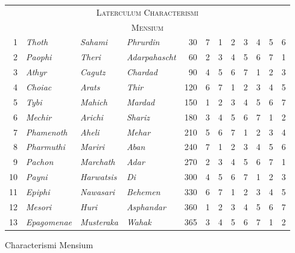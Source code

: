 %
\begin{tabnums} %
\normalsize
\centering
\renewcommand{\arraystretch}{1.066} %
\newcommand{\hts}{\scriptsize}
\newcommand{\cwd}{4em}
%
\newcommand{\da}{\scriptsize{†}}
\begin{tabular}{@{} r lll r @{\hspace{2em}} ccccccc @{}}
\toprule
\multicolumn{12}{c}{\Large\textsc{Laterculum Characterismi}} \\
\multicolumn{12}{c}{\large\textsc{Mensium}} \\
\toprule
 1&\itshape Thoth      & \itshape Sahami     & \itshape Phrurdin
    &  30 & 7 & 1 & 2 & 3 & 4 & 5 & 6 \\
 2&\itshape Paophi     & \itshape Theri      & \itshape Adarpahascht
    &  60 & 2 & 3 & 4 & 5 & 6 & 7 & 1 \\
 3&\itshape Athyr      & \itshape Cagutz     & \itshape Chardad
    &  90 & 4 & 5 & 6 & 7 & 1 & 2 & 3 \\

 4&\itshape Choiac     & \itshape Arats      & \itshape Thir
    & 120 & 6 & 7 & 1 & 2 & 3 & 4 & 5 \\
 5&\itshape Tybi       & \itshape Mahich     & \itshape Mardad
    & 150 & 1 & 2 & 3 & 4 & 5 & 6 & 7 \\
 6&\itshape Mechir     & \itshape Arichi     & \itshape Shariz
    & 180 & 3 & 4 & 5 & 6 & 7 & 1 & 2 \\

 7&\itshape Phamenoth  & \itshape Aheli      & \itshape Mehar
    & 210 & 5 & 6 & 7 & 1 & 2 & 3 & 4 \\
 8&\itshape Pharmuthi  & \itshape Mariri     & \itshape Aban
    & 240 & 7 & 1 & 2 & 3 & 4 & 5 & 6 \\
 9&\itshape Pachon     & \itshape Marchath   & \itshape Adar
    & 270 & 2 & 3 & 4 & 5 & 6 & 7 & 1 \\

10&\itshape Payni      & \itshape Harwatsis  & \itshape Di
    & 300 & 4 & 5 & 6 & 7 & 1 & 2 & 3 \\
11&\itshape Epiphi     & \itshape Nawasari   & \itshape Behemen
    & 330 & 6 & 7 & 1 & 2 & 3 & 4 & 5 \\
12&\itshape Mesori     & \itshape Huri       & \itshape Asphandar
    & 360 & 1 & 2 & 3 & 4 & 5 & 6 & 7 \\
13&\itshape Epagomenae & \itshape Musteraka  & \itshape Wahak
    & 365 & 3 & 4 & 5 & 6 & 7 & 1 & 2 \\
\bottomrule
\end{tabular}
%
\caption{Characterismi Mensium}
\label{tab:p218a}
%
\end{tabnums}
